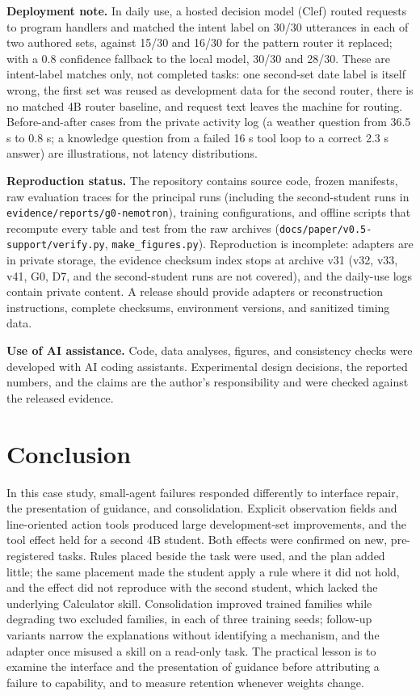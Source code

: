\documentclass[
  10pt,
]{article}
\begin{document}
\textbf{Deployment note.} In daily use, a hosted decision model (Clef)
routed requests to program handlers and matched the intent label on
30/30 utterances in each of two authored sets, against 15/30 and 16/30
for the pattern router it replaced; with a 0.8 confidence fallback to
the local model, 30/30 and 28/30. These are intent-label matches only,
not completed tasks: one second-set date label is itself wrong, the
first set was reused as development data for the second router, there is
no matched 4B router baseline, and request text leaves the machine for
routing. Before-and-after cases from the private activity log (a weather
question from 36.5 s to 0.8 s; a knowledge question from a failed 16 s
tool loop to a correct 2.3 s answer) are illustrations, not latency
distributions.

\textbf{Reproduction status.} The repository contains source code,
frozen manifests, raw evaluation traces for the principal runs
(including the second-student runs in
\texttt{evidence/reports/g0-nemotron}), training configurations, and
offline scripts that recompute every table and test from the raw
archives (\texttt{docs/paper/v0.5-support/verify.py},
\texttt{make\_figures.py}). Reproduction is incomplete: adapters are in
private storage, the evidence checksum index stops at archive v31 (v32,
v33, v41, G0, D7, and the second-student runs are not covered), and the
daily-use logs contain private content. A release should provide
adapters or reconstruction instructions, complete checksums, environment
versions, and sanitized timing data.

\textbf{Use of AI assistance.} Code, data analyses, figures, and
consistency checks were developed with AI coding assistants.
Experimental design decisions, the reported numbers, and the claims are
the author's responsibility and were checked against the released
evidence.

\section{Conclusion}\label{conclusion}

In this case study, small-agent failures responded differently to
interface repair, the presentation of guidance, and consolidation.
Explicit observation fields and line-oriented action tools produced
large development-set improvements, and the tool effect held for a
second 4B student. Both effects were confirmed on new, pre-registered
tasks. Rules placed beside the task were used, and the plan added
little; the same placement made the student apply a rule where it did
not hold, and the effect did not reproduce with the second student,
which lacked the underlying Calculator skill. Consolidation improved
trained families while degrading two excluded families, in each of three
training seeds; follow-up variants narrow the explanations without
identifying a mechanism, and the adapter once misused a skill on a
read-only task. The practical lesson is to examine the interface and the
presentation of guidance before attributing a failure to capability, and
to measure retention whenever weights change.
\end{document}
